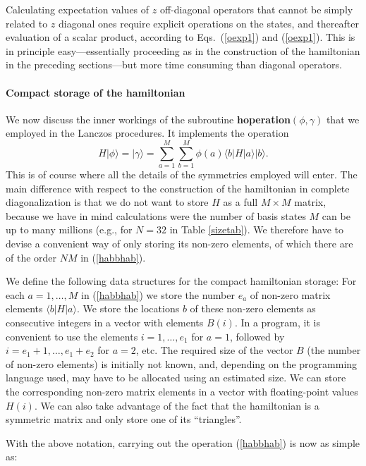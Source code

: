 \documentclass[draft,numberedheadings]{aipproc}
\begin{document}
Calculating expectation values of $z$ off-diagonal operators that cannot be simply related to $z$ diagonal ones require explicit operations on the states, and 
thereafter evaluation of a scalar product, according to Eqs.~(\ref{oexp1}) and (\ref{oexp1}). This is in principle easy---essentially proceeding as in the 
construction of the hamiltonian in the preceding sections---but more time consuming than diagonal operators.

\paragraph{Compact storage of the hamiltonian}

We now discuss the inner workings of the subroutine {\bf hoperation}$(\phi,\gamma)$ that we employed in the Lanczos procedures. It implements the operation
\begin{equation}
H|\phi\rangle = |\gamma\rangle = \sum_{a=1}^M\sum_{b=1}^M \phi(a)\langle b|H|a\rangle |b\rangle.
\label{habbhab}
\end{equation}
This is of course where all the details of the symmetries employed will enter. The main difference with respect to the construction of the hamiltonian 
in complete diagonalization is that we do not want to store $H$ as a full $M\times M$ matrix, because we have in mind calculations were the number of basis states $M$ 
can be up to many millions (e.g., for $N=32$ in Table \ref{sizetab}). We therefore have to devise a convenient way of only storing its non-zero elements, of which 
there are of the order $NM$ in (\ref{habbhab}).  

We define the following data structures for the compact hamiltonian storage: For each $a=1,\ldots,M$ in (\ref{habbhab}) we store the number $e_a$ of non-zero matrix 
elements $\langle b|H|a\rangle$. We store the locations $b$ of these non-zero elements as consecutive integers in a vector with elements $B(i)$. In a program, it is 
convenient to use the elements $i=1,\ldots,e_1$ for $a=1$, followed by $i=e_1+1,\ldots,e_1+e_2$ for $a=2$, etc. The required size of the vector $B$ (the number of
non-zero elements) is initially not known, and, depending on the programming language used, may have to be allocated using an estimated size. We can store the 
corresponding non-zero matrix elements in a vector with floating-point values $H(i)$. We can also take advantage 
of the fact that the hamiltonian is a symmetric matrix and only store one of its ``triangles''.

With the above notation, carrying out the operation (\ref{habbhab}) is now as simple as:
\end{document}
